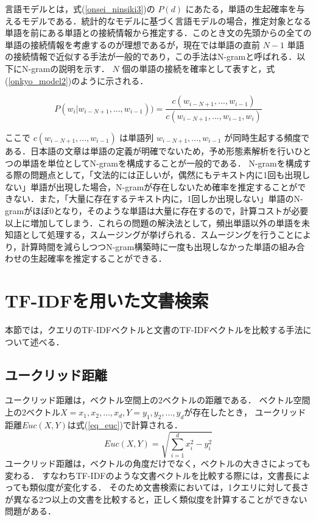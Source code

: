 言語モデルとは，式(\ref{onsei_ninsiki3})の $P(d)$ にあたる，単語の生起確率を与えるモデルである．統計的なモデルに基づく言語モデルの場合，推定対象となる単語を前にある単語との接続情報から推定する．このとき文の先頭からの全ての単語の接続情報を考慮するのが理想であるが，現在では単語の直前 $N-1$ 単語の接続情報で近似する手法が一般的であり，この手法はN-gramと呼ばれる．以下にN-gramの説明を示す． 
 $N$ 個の単語の接続を確率として表すと，式(\ref{onkyo_model2})のように示される．

\begin{equation}
    P(w_i|w_{i-N+1}, ..., w_{i-1})) = \frac{ c(w_{i-N+1}, ..., w_{i-1}) }{ c(w_{i-N+1}, ..., w_{i-1}, w_i) }  
    \label{onkyo_model2}
\end{equation}

ここで $c(w_{i-N+1}, ..., w_{i-1})$ は単語列 $w_{i-N+1}, ..., w_{i-1}$ が同時生起する頻度である．日本語の文章は単語の定義が明確でないため，予め形態素解析を行いひとつの単語を単位としてN-gramを構成することが一般的である． 
N-gramを構成する際の問題点として，「文法的には正しいが，偶然にもテキスト内に1回も出現しない」単語が出現した場合，N-gramが存在しないため確率を推定することができない．また，「大量に存在するテキスト内に，1回しか出現しない」単語のN-gramがほぼ0となり，そのような単語は大量に存在するので，計算コストが必要以上に増加してしまう．これらの問題の解決法として，頻出単語以外の単語を未知語として処理する，スムージングが挙げられる．スムージングを行うことにより，計算時間を減らしつつN-gram構築時に一度も出現しなかった単語の組み合わせの生起確率を推定することができる．


%
%


\section{TF-IDFを用いた文書検索} \label{sec_tfidf}
本節では，クエリのTF-IDFベクトルと文書のTF-IDFベクトルを比較する手法について述べる．
\subsection{ユークリッド距離}
ユークリッド距離は，ベクトル空間上の2ベクトルの距離である．
ベクトル空間上の2ベクトル$X = {x_1, x_2, ..., x_d}, Y = {y_1, y_2, ..., y_d}$が存在したとき，
ユークリッド距離$Euc(X, Y)$は式(\ref{eq_euc})で計算される．
\begin{equation}
    Euc(X, Y) = \sqrt{\sum^{d}_{i=1}{x_i^2 - y_i^2}}    \label{eq_euc}
\end{equation}
ユークリッド距離は，ベクトルの角度だけでなく，ベクトルの大きさによっても変わる．
すなわちTF-IDFのような文書ベクトルを比較する際には，文書長によっても類似度が変化する．
そのため文書検索においては，1クエリに対して長さが異なる2つ以上の文書を比較すると，正しく類似度を計算することができない問題がある．


